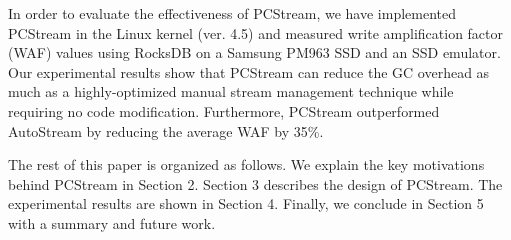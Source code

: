 In order to evaluate the effectiveness of \textsf{\small PCStream}, 
we have implemented \textsf{\small PCStream}
in the Linux kernel (ver. 4.5) and measured write amplification factor (WAF) values 
using RocksDB on a Samsung PM963 SSD 
and an SSD emulator.
Our experimental results show that \textsf{\small PCStream}
can reduce the GC overhead as much as a highly-optimized 
manual stream management technique while requiring no code modification.  
Furthermore, \textsf{\small PCStream} outperformed \textsf{\small AutoStream} by reducing the average WAF by 35\%.

The rest of this paper is organized as follows. 
We explain the key motivations behind \textsf{\small PCStream} in Section 2. 
Section 3 describes 
the design of \textsf{\small PCStream}.
The experimental results are shown in Section 4. 
Finally, we conclude in Section 5 with a summary and future work. 

